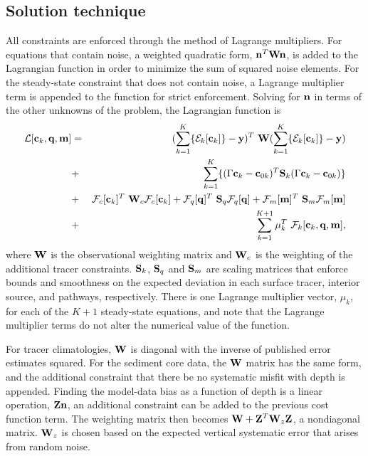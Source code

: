 \documentclass[agums]{aguplus}  %
\begin{document}
\subsection{Solution technique}
\label{sec:solution}

All constraints are enforced through the method of Lagrange
multipliers.  For equations that contain noise, a weighted quadratic
form, ${\bf n}^T {\bf W} {\bf n}$, is added to the Lagrangian function
in order to minimize the sum of squared noise elements.  For the
steady-state constraint that does not contain noise, a Lagrange
multiplier term is appended to the function for strict
enforcement. Solving for ${\bf n}$ in terms of the other unknowns of
the problem, the Lagrangian function is
\begin{eqnarray}
\label{eq:lagrangian}
   {\cal L} [{\bf c}_k,{\bf q},{\bf m}] &=&  (\sum^K_{k=1} \{ {\cal
     E}_k [{\bf c}_k] \} - {\bf
  y})^T ~{\bf W} ( \sum^K_{k=1} \{ {\cal E}_k [{\bf c}_k] \} - {\bf y}) \\
&+&  \sum^K_{k=1} \{ (\Gamma {\bf c}_k - {\bf c}_{0k})^T {\bf
   S}_k   (\Gamma {\bf c}_k - {\bf c}_{0k}) \}\\
& +&  {\cal F}_c [{\bf c}_k]^T ~{\bf W}_c  {\cal
   F}_c[ {\bf c}_k]  
 +  {\cal F}_q[{\bf q}]^T ~{\bf S}_q  {\cal F}_q
 [{\bf q}] +  {\cal F}_m [{\bf m}]^T ~{\bf S}_m {\cal
   F}_m [{\bf m}] \\ 
&+&\sum^{K+1}_{k=1}  \mu_k^T ~{\cal F}_k [{\bf c}_k,{\bf q},{\bf m}],
\label{eq:lagrangian2}
\end{eqnarray}
where ${\bf W}$ is the observational weighting matrix and ${\bf W}_c$ is
the weighting of the additional tracer constraints. ${\bf S}_k$, ${\bf
  S}_q$ and ${\bf S}_m$ are scaling matrices that enforce bounds and
smoothness on the expected deviation in each surface tracer, interior
source, and pathways, respectively. 
There is one Lagrange multiplier
vector, $\mu_k$, for each of the $K+1$ steady-state equations, and
note that the Lagrange multiplier terms do not alter the numerical
value of the function.

For tracer climatologies, ${\bf W}$ is diagonal with the inverse of published error estimates squared. For the sediment core data, the ${\bf W}$ matrix has the same form, and the additional constraint that there be no systematic misfit with depth is appended. Finding the model-data bias as a function of depth is a linear operation, ${\bf Z}{\bf n}$, an additional constraint can be added to the previous cost function term. The weighting matrix then becomes ${\bf W} + {\bf Z}^T {\bf W}_z {\bf Z}$, a nondiagonal matrix. ${\bf W}_z$ is chosen based on the expected vertical systematic error that arises from random noise.
\end{document}
